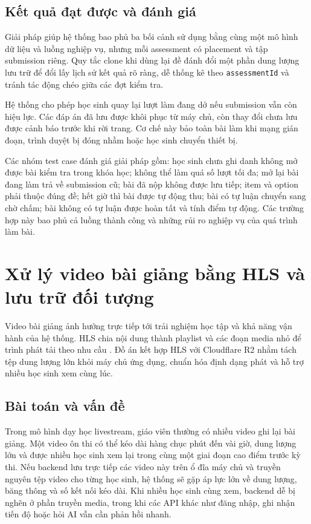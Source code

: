 \documentclass[../DoAn.tex]{subfiles}
\begin{document}
\subsection{Kết quả đạt được và đánh giá}
\label{section:5.2.3}

Giải pháp giúp hệ thống bao phủ ba bối cảnh sử dụng bằng cùng một mô hình dữ liệu và luồng nghiệp vụ, nhưng mỗi assessment có placement và tập submission riêng. Quy tắc clone khi dùng lại đề đánh đổi một phần dung lượng lưu trữ để đổi lấy lịch sử kết quả rõ ràng, dễ thống kê theo \texttt{assessmentId} và tránh tác động chéo giữa các đợt kiểm tra.

Hệ thống cho phép học sinh quay lại lượt làm đang dở nếu submission vẫn còn hiệu lực. Các đáp án đã lưu được khôi phục từ máy chủ, còn thay đổi chưa lưu được cảnh báo trước khi rời trang. Cơ chế này bảo toàn bài làm khi mạng gián đoạn, trình duyệt bị đóng nhầm hoặc học sinh chuyển thiết bị.

Các nhóm test case đánh giá giải pháp gồm: học sinh chưa ghi danh không mở được bài kiểm tra trong khóa học; không thể làm quá số lượt tối đa; mở lại bài đang làm trả về submission cũ; bài đã nộp không được lưu tiếp; item và option phải thuộc đúng đề; hết giờ thì bài được tự động thu; bài có tự luận chuyển sang chờ chấm; bài không có tự luận được hoàn tất và tính điểm tự động. Các trường hợp này bao phủ cả luồng thành công và những rủi ro nghiệp vụ của quá trình làm bài.

\section{Xử lý video bài giảng bằng HLS và lưu trữ đối tượng}
\label{section:5.3}

Video bài giảng ảnh hưởng trực tiếp tới trải nghiệm học tập và khả năng vận hành của hệ thống. HLS chia nội dung thành playlist và các đoạn media nhỏ để trình phát tải theo nhu cầu \cite{pantos2017hls}. Đồ án kết hợp HLS với Cloudflare R2 nhằm tách tệp dung lượng lớn khỏi máy chủ ứng dụng, chuẩn hóa định dạng phát và hỗ trợ nhiều học sinh xem cùng lúc.

\subsection{Bài toán và vấn đề}
\label{section:5.3.1}

Trong mô hình dạy học livestream, giáo viên thường có nhiều video ghi lại bài giảng. Một video ôn thi có thể kéo dài hàng chục phút đến vài giờ, dung lượng lớn và được nhiều học sinh xem lại trong cùng một giai đoạn cao điểm trước kỳ thi. Nếu backend lưu trực tiếp các video này trên ổ đĩa máy chủ và truyền nguyên tệp video cho từng học sinh, hệ thống sẽ gặp áp lực lớn về dung lượng, băng thông và số kết nối kéo dài. Khi nhiều học sinh cùng xem, backend dễ bị nghẽn ở phần truyền media, trong khi các API khác như đăng nhập, ghi nhận tiến độ hoặc hỏi AI vẫn cần phản hồi nhanh.
\end{document}
